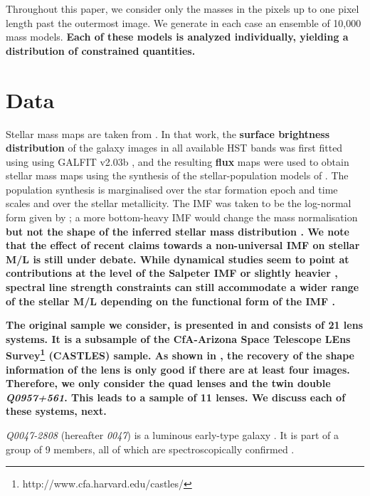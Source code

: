 \documentclass[useAMS,usenatbib]{mn2e}
\newcommand{\cb}[1]{{\color{red} \textbf{#1}}}
\begin{document}
Throughout this paper, we consider only the masses in the pixels up to one pixel length past the outermost image. We generate in each case an ensemble of 10,000 mass models. \cb{Each of these models is analyzed individually, yielding a distribution of constrained quantities.}


\section{Data}\label{sec:data}
Stellar mass maps are taken from \cite{2011ApJ...740...97L}. In that work, the \cb{surface brightness distribution} of the galaxy images in all available HST bands was first fitted using using GALFIT v2.03b \citep{2002AJ....124..266P}, and the resulting \cb{flux} maps were used to obtain stellar mass maps using the synthesis of the stellar-population models of \cite{2003MNRAS.344.1000B}. The population synthesis is marginalised over the star formation epoch and time scales and over the stellar metallicity. The IMF was taken to be the log-normal form given by \cite{2003PASP..115..763C}; a more bottom-heavy IMF would change the mass normalisation \citep[cf.][]{2014ApJ...793...96S} \cb{but not the shape of the inferred stellar mass distribution \citep[unless the IMF presents significant intrinsic deviations locally, see e.g.][]{2015MNRAS.447.1033M}. We note that the effect of recent claims towards a non-universal IMF on stellar M/L is still under debate. While dynamical studies seem to point at contributions at the level of the Salpeter IMF or slightly heavier \citep{2013MNRAS.432.1862C}, spectral line strength constraints can still accommodate a wider range of the stellar M/L depending on the functional form of the IMF \citep{2013MNRAS.429L..15F}.}

\cb{The original sample we consider, is presented in \cite{2011ApJ...740...97L} and consists of 21 lens systems. It is a subsample of the CfA-Arizona Space Telescope LEns Survey\footnote{http://www.cfa.harvard.edu/castles/} (CASTLES) sample. As shown in \citep{2014arXiv1401.7990C}, the recovery of the shape information of the lens is only good if there are at least four images. Therefore, we only consider the quad lenses and the twin double \textit{Q0957+561}. This leads to a sample of 11 lenses. We discuss each of these systems, next.}

\textit{Q0047-2808} (hereafter \textit{0047}) is a luminous early-type galaxy \citep{1996MNRAS.278..139W}. It is part of a group of 9 members, all of which are spectroscopically confirmed \citep{2011ApJ...726...84W}.
\end{document}
